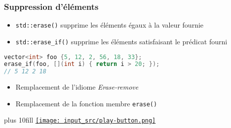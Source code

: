 \documentclass[C++.tex]{subfiles}
\begin{document}
\begin{frame}[fragile]
	\frametitle{Suppression d'éléments}
	\begin{itemize}
		\item \lstinline|std::erase()| supprime les éléments égaux à la valeur fournie
		\item \lstinline|std::erase_if()| supprime les éléments satisfaisant le prédicat fourni
	\end{itemize}

	\begin{lstlisting}[language=C++]
vector<int> foo {5, 12, 2, 56, 18, 33};
erase_if(foo, [](int i) { return i > 20; });
// 5 12 2 18\end{lstlisting}

	\begin{itemize}
		\item Remplacement de l'idiome \og \textit{Erase-remove}\fg{} 
		\item Remplacement de la fonction membre \lstinline|erase()|
	\end{itemize}

	\vskip 10mm plus 10fill
	\hfill
	\href{https://godbolt.org/#g:!((g:!((g:!((h:codeEditor,i:(filename:'1',fontScale:14,fontUsePx:'0',j:1,lang:c%2B%2B,selection:(endColumn:1,endLineNumber:26,positionColumn:1,positionLineNumber:26,selectionStartColumn:1,selectionStartLineNumber:1,startColumn:1,startLineNumber:1),source:'%23include+%3Cvector%3E%0A%23include+%3Cmap%3E%0A%23include+%3Cstring%3E%0A%23include+%3Ciostream%3E%0A%0Aint+main()%0A%7B%0A++std::vector%3Cint%3E+foo+%7B5,+12,+2,+56,+18,+33%7D%3B%0A++std::erase_if(foo,+%5B%5D(int+i)+%7Breturn+i+%3E+20%3B%7D)%3B%0A%0A++for(int+i+:+foo)%0A++%7B%0A++++std::cout+%3C%3C+i+%3C%3C+%22+%22%3B%0A++%7D%0A++std::cout+%3C%3C+%22%5Cn%22%3B%0A%0A++std::map%3Cint,+std::string%3E+bar%7B%7B5,+%22a%22%7D,+%7B12,+%22b%22%7D,+%7B2,+%22c%22%7D,+%7B42,+%22d%22%7D%7D%3B%0A++std::erase_if(bar,+%5B%5D(std::pair%3Cint,+std::string%3E+i)+%7Breturn+i.first+%3E+20%3B%7D)%3B%0A%0A++for(auto+i+:+bar)%0A++%7B%0A++++std::cout+%3C%3C+i.first+%3C%3C+%22+:+%22+%3C%3C+i.second+%3C%3C+%22+%22%3B%0A++%7D%0A++std::cout+%3C%3C+%22%5Cn%22%3B%0A%7D%0A'),l:'5',n:'0',o:'C%2B%2B+source+%231',t:'0')),k:50,l:'4',n:'0',o:'',s:0,t:'0'),(g:!((h:executor,i:(argsPanelShown:'1',compilationPanelShown:'0',compiler:g122,compilerName:'',compilerOutShown:'0',execArgs:'',execStdin:'',fontScale:14,fontUsePx:'0',j:1,lang:c%2B%2B,libs:!((name:boost,ver:'175')),options:'-std%3Dc%2B%2B20+-Wall+-Wextra+-pedantic',source:1,stdinPanelShown:'1',tree:'1',wrap:'0'),l:'5',n:'0',o:'Executor+x86-64+gcc+12.2+(C%2B%2B,+Editor+%231)',t:'0')),header:(),k:50,l:'4',n:'0',o:'',s:0,t:'0')),l:'2',n:'0',o:'',t:'0')),version:4}{\texttt{[image: input\_src/play-button.png]}}
\end{frame}
\end{document}

